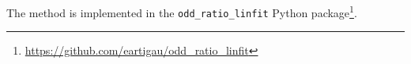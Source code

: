 The method is implemented in the \texttt{odd\_ratio\_linfit} Python package\footnote{%
    \url{https://github.com/eartigau/odd_ratio_linfit}}.



%
%
%
%
%
